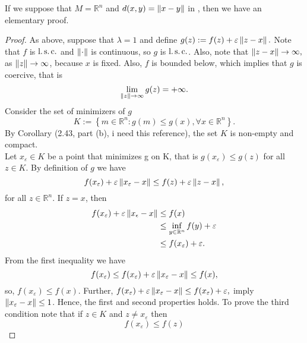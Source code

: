     \noindent If we suppose that $M = \mathbb{R}^{n}$ and $d(x,y) = \left\lVert x - y\right\rVert$ 
    in , then we have an elementary proof.
    \begin{proof}
        As above, suppose that $\lambda = 1$ and define
        $
            g(z) := f(z) + \varepsilon \left\lVert z - x\right\rVert.
        $
        Note that $f$ is $\operatorname{l.s.c.}$ and $\left\lVert\cdot\right\rVert$ is continuous, so $g$ is
        $\operatorname{l.s.c.}$. Also, note that
        $
            \left\lVert z - x\right\rVert \to \infty,
        $
        as $\left\lVert z\right\rVert \to \infty$, because $x$ is fixed. Also, $f$ is bounded below, which
        implies that $g$ is coercive, that is
        $$
            \lim_{\left\lVert z\right\rVert \to \infty} g(z) = + \infty.
        $$
        Consider the set of minimizers of $g$
        $$
            K := \left\{ m \in \mathbb{R}^{n} : g(m) \leq g(x), \forall x \in  %
             \mathbb{R}^{n} \right\}.
        $$
        By Corollary (2.43, part (b), i need this reference), the set $K$ is 
        non-empty and compact. \\
        Let $x_{\varepsilon} \in K$ be a point that minimizes g on K, that is $ g(x_{\varepsilon}) \leq g(z)$ for all $z \in K$. By definition of $g$ we have
        $$
            f(x_{\varepsilon}) + \varepsilon \norm{x_{\varepsilon} - x} \leq %
            f(z) + \varepsilon \norm{z-x},
        $$
        for all $z\in \mathbb{R}^{n}$. If $z = x$, then 
        \begin{align*}
            f(x_\varepsilon) + \varepsilon \left\lVert x_{\epsilon} - x\right\rVert 
                &\leq f(x) \\
                &\leq \inf_{y \in \mathbb{R}^{n}} f(y) + \varepsilon \\
                &\leq f(x_{\varepsilon}) + \varepsilon .
        \end{align*}
        From the first inequality we have
        $$
            f(x_\varepsilon) \leq f(x_\varepsilon)  + \varepsilon\norm{x_\varepsilon -x} %
            \leq f(x),
        $$
        so, $f(x_{\varepsilon}) \leq f(x)$. Further,
        $
            f(x_{\varepsilon}) + \varepsilon \norm{x_{\varepsilon} - x} \leq %
                f(x_{\varepsilon}) + \varepsilon,
        $
        imply $\left\lVert x_{\varepsilon} - x\right\rVert \leq 1$. 
        Hence, the first and second properties holds. To prove the third 
        condition  note that if $z\in K$ and $z\neq x_{\varepsilon}$ then
        $$
            f(x_{\varepsilon})\leq f(z)
$$
\end{proof}
